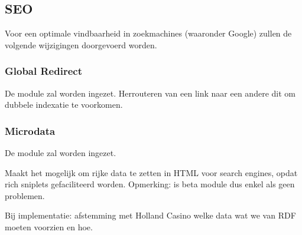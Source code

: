 \subsection{SEO}\label{seo}
Voor een optimale vindbaarheid in zoekmachines (waaronder Google) zullen de volgende wijzigingen doorgevoerd worden.






\subsubsection{Global Redirect}\label{global-redirect}
De module  zal worden ingezet. Herrouteren van een link naar een andere dit om dubbele indexatie te voorkomen.


\subsubsection{Microdata}\label{microdata}
De module  zal worden ingezet. 

Maakt het mogelijk om rijke data te zetten in HTML voor search engines, opdat rich sniplets gefaciliteerd worden. Opmerking: is beta module dus enkel als geen problemen. 

Bij implementatie: afstemming met Holland Casino welke data wat we van RDF moeten voorzien en hoe.



